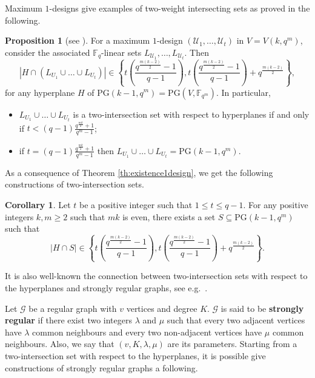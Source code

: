 \documentclass[11pt]{amsart}
\theoremstyle{definition}
\newtheorem{corollary}[theorem]{Corollary}
\newtheorem{proposition}[theorem]{Proposition}
\newcommand{\F}{{\mathbb F}}
\newcommand{\U}{{\mathcal{U}}}
\newcommand{\fq}{{\mathbb F}_{q}}
\newcommand{\PG}{\mathrm{PG}}
\begin{document}
Maximum $1$-designs give examples of two-weight intersecting sets as proved in the following.

\begin{proposition} [see \textnormal{\cite[Corollary 5.14]{santonastaso2022subspace}}]
For a maximum $1$-design $(\U_1,\ldots,\U_t)$ in $V=V(k,q^m)$, consider the associated $\fq$-linear sets $L_{\U_1},\ldots,L_{\U_t}$.
Then
\[ \left| H \cap (L_{U_1}\cup \ldots\cup L_{U_t}) \right| \in \left\{t \left(\frac{q^{\frac{m(k-2)}{2}}-1}{q-1}\right),t \left(\frac{q^{\frac{m(k-2)}{2}}-1}{q-1}\right)+q^{\frac{m(k-2)}{2}}\right\}, \]
 for any hyperplane $H$ of $\PG(k-1,q^m)=\PG(V,\F_{q^m})$.
In particular, 
\begin{itemize}
\item $L_{U_1}\cup \ldots\cup L_{U_t}$ is a two-intersection set with respect to hyperplanes if and only if $t< (q-1)\frac{q^{\frac{mk}2}+1}{q^m-1}$;
\item if $t= (q-1)\frac{q^{\frac{mk}2}+1}{q^m-1}$ then $L_{U_1}\cup \ldots\cup L_{U_t}=\PG(k-1,q^m)$.
\end{itemize}
\end{proposition}

As a consequence of Theorem \ref{th:existence1design}, we get the following constructions of two-intersection sets.

\begin{corollary}
    Let $t$ be a positive integer such that $1 \leq t \leq q-1$. For any positive integers $k,m \geq 2$ such that $mk$ is even, there exists a set $S \subseteq \PG(k-1,q^m)$ such that
    \[ \left| H \cap S \right| \in \left\{t \left(\frac{q^{\frac{m(k-2)}{2}}-1}{q-1}\right),t \left(\frac{q^{\frac{m(k-2)}{2}}-1}{q-1}\right)+q^{\frac{m(k-2)}{2}}\right\}. \]
\end{corollary}

It is also well-known the connection between two-intersection sets with respect to the hyperplanes and strongly regular graphs, see e.g.\ \cite{calderbank1986geometry}.

Let $\mathcal{G}$ be a regular graph with $v$ vertices and degree $K$. $\mathcal{G}$ is said to be \textbf{strongly regular} if there exist two integers $\lambda$ and $\mu$ such that every two adjacent vertices have $\lambda$ common neighbours and every two non-adjacent vertices have $\mu$ common neighbours. Also, we say that $(v,K,\lambda,\mu)$ are its parameters. Starting from a two-intersection set with respect to the hyperplanes, it is possible give constructions of strongly regular graphs a following.
\end{document}

